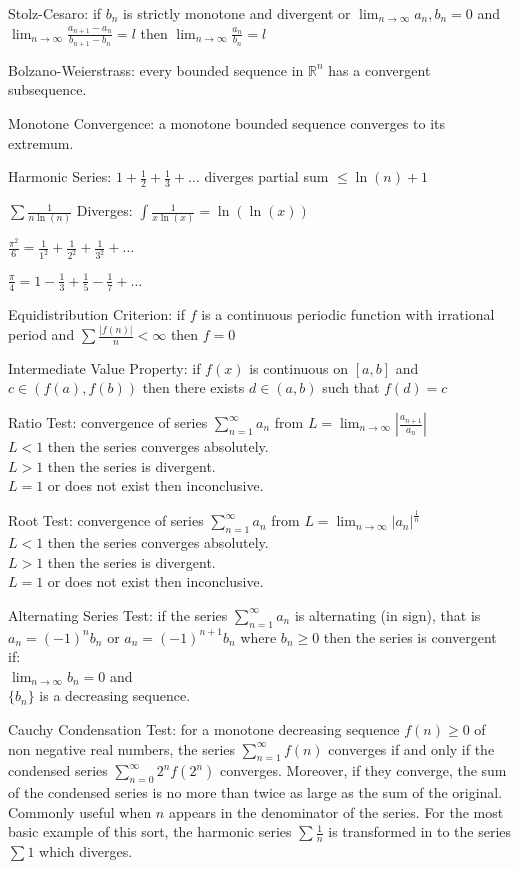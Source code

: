 Stolz-Cesaro: if $b_n$ is strictly monotone and divergent or $\lim_{n \to \infty} a_n, b_n = 0$ and $\lim_{n \to \infty} \frac{a_{n+1}-a_n}{b_{n+1}-b_n} = l$ then $\lim_{n \to \infty} \frac{a_n}{b_n} = l$

Bolzano-Weierstrass: every bounded sequence in $\mathbb{R}^n$ has a convergent subsequence.

Monotone Convergence: a monotone bounded sequence converges to its extremum.

Harmonic Series: $1+\frac{1}{2}+\frac{1}{3}+\dots$ diverges partial sum $\le \ln(n)+1$

$\sum \frac{1}{n\ln(n)}$ Diverges: $\int \frac{1}{x\ln(x)} = \ln(\ln(x))$

$\frac{\pi^2}{6} = \frac{1}{1^2} + \frac{1}{2^2} + \frac{1}{3^2} + \dots$

$\frac{\pi}{4}=1-\frac{1}{3} +\frac{1}{5}-\frac{1}{7}+\dots$

Equidistribution Criterion: if $f$ is a continuous periodic function with irrational period and $\sum \frac{|f(n)|}{n} < \infty$ then $f=0$

Intermediate Value Property: if $f(x)$ is continuous on $[a,b]$ and $c \in (f(a),f(b))$ then there exists $d \in (a,b)$ such that $f(d)=c$

Ratio Test: convergence of series $\sum_{n=1}^{\infty} a_n$ from $L = \lim_{n \to \infty} \left|\frac{a_{n+1}}{a_n} \right|$ \\
$L<1$ then the series converges absolutely. \\
$L>1$ then the series is divergent. \\
$L=1$ or does not exist then inconclusive.

Root Test: convergence of series $\sum_{n=1}^{\infty} a_n$ from $L = \lim_{n \to \infty} |a_n|^{\frac{1}{n}}$ \\
$L<1$ then the series converges absolutely. \\
$L>1$ then the series is divergent. \\
$L=1$ or does not exist then inconclusive.

Alternating Series Test: if the series $\sum_{n=1}^{\infty} a_n$ is alternating (in sign), that is $a_n=(-1)^n b_n$ or $a_n=(-1)^{n+1} b_n$ where $b_n \ge 0$ then the series is convergent if: \\
$\lim_{n \to \infty} b_n = 0$ and \\
$\{b_n \}$ is a decreasing sequence.

Cauchy Condensation Test: for a monotone decreasing sequence $f(n) \ge 0$ of non negative real numbers, the series $\sum_{n=1}^{\infty} f(n)$ converges if and only if the condensed series $\sum_{n=0}^{\infty} 2^nf(2^n)$ converges. Moreover, if they converge, the sum of the condensed series is no more than twice as large as the sum of the original. Commonly useful when $n$ appears in the denominator of the series. For the most basic example of this sort, the harmonic series $\sum \frac{1}{n}$ is transformed in to the series $\sum 1$ which diverges.

